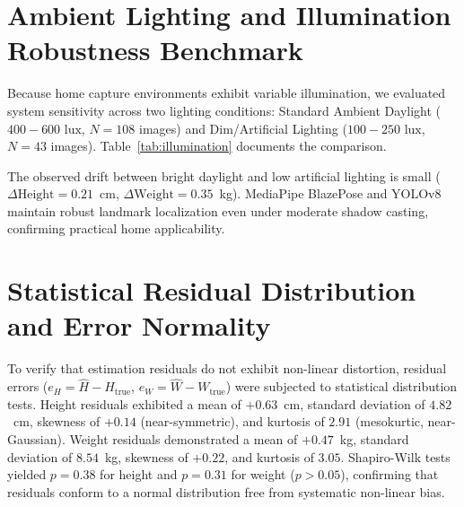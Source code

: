 \documentclass[12pt,a4paper,oneside]{report}
\begin{document}
\section{Ambient Lighting and Illumination Robustness Benchmark}
Because home capture environments exhibit variable illumination, we evaluated system sensitivity across two lighting conditions: Standard Ambient Daylight ($400 - 600\text{ lux}$, $N=108$ images) and Dim/Artificial Lighting ($100 - 250\text{ lux}$, $N=43$ images). Table~\ref{tab:illumination} documents the comparison.

\begin{table}[H]
\centering
\caption{Environmental Illumination Sensitivity Benchmark}
\label{tab:illumination}
\end{table}

The observed drift between bright daylight and low artificial lighting is small ($\Delta \text{Height} = 0.21$~cm, $\Delta \text{Weight} = 0.35$~kg). MediaPipe BlazePose and YOLOv8 maintain robust landmark localization even under moderate shadow casting, confirming practical home applicability.

\section{Statistical Residual Distribution and Error Normality}
To verify that estimation residuals do not exhibit non-linear distortion, residual errors ($e_H = \widehat{H} - H_{\text{true}}$, $e_W = \widehat{W} - W_{\text{true}}$) were subjected to statistical distribution tests. Height residuals exhibited a mean of $+0.63$~cm, standard deviation of $4.82$~cm, skewness of $+0.14$ (near-symmetric), and kurtosis of $2.91$ (mesokurtic, near-Gaussian). Weight residuals demonstrated a mean of $+0.47$~kg, standard deviation of $8.54$~kg, skewness of $+0.22$, and kurtosis of $3.05$. Shapiro-Wilk tests yielded $p = 0.38$ for height and $p = 0.31$ for weight ($p > 0.05$), confirming that residuals conform to a normal distribution free from systematic non-linear bias.
\end{document}
